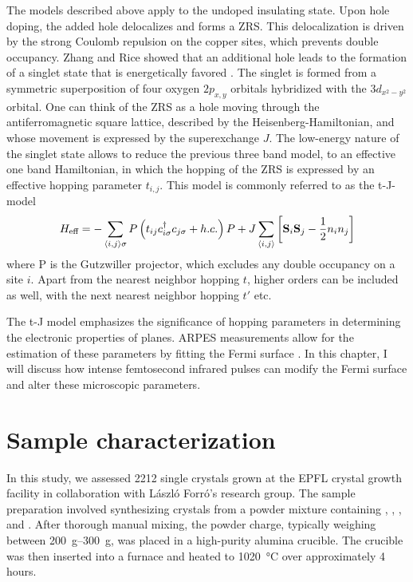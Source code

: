 The models described above apply to the undoped insulating state.
Upon hole doping, the added hole delocalizes and forms a ZRS.
This delocalization is driven by the strong Coulomb repulsion on the copper sites, which prevents double occupancy.
Zhang and Rice showed that an additional hole leads to the formation of a singlet state that is energetically favored \cite{zhang_effective_1988}.
The singlet is formed from a symmetric superposition of four oxygen $2p_{x,y}$ orbitals hybridized with the  $3d_{x^2-y^2}$ orbital.
One can think of the ZRS as a hole moving through the antiferromagnetic square lattice, described by the Heisenberg-Hamiltonian, and whose movement is expressed by the superexchange $J$.
The low-energy nature of the singlet state allows to reduce the previous three band model, to an effective one band Hamiltonian, in which the hopping of the ZRS is expressed by an effective hopping parameter $t_{i,j}$.
This model is commonly referred to as the t-J-model
\begin{equation}
	H_\text{eff} = - \sum_{\braket{i,j}\sigma} P \left( t_{ij} c_{i\sigma}^\dagger c_{j\sigma} + h.c. \right) P + J \sum_{\braket{i,j}} \left[\mathbf{S}_i \mathbf{S}_j - \frac{1}{2} n_i n_j\right]
\end{equation}
where P is the Gutzwiller projector, which excludes any double occupancy on a site $i$.
Apart from the nearest neighbor hopping $t$, higher orders can be included as well, with the next nearest neighbor hopping $t'$ etc.

The t-J model emphasizes the significance of hopping parameters in determining the electronic properties of  planes.
ARPES measurements allow for the estimation of these parameters by fitting the Fermi surface \cite{norman_phenomenological_1995}.
In this chapter, I will discuss how intense femtosecond infrared pulses can modify the Fermi surface and alter these microscopic parameters.

\section{Sample characterization}

In this study, we assessed 2212 single crystals grown at the EPFL crystal growth facility in collaboration with László Forró's research group.
The sample preparation involved synthesizing crystals from a powder mixture containing , , , and .
After thorough manual mixing, the powder charge, typically weighing between \qtyrange{200}{300}{\gram}, was placed in a high-purity alumina crucible. The crucible was then inserted into a furnace and heated to \qty{1020}{\degreeCelsius} over approximately 4 hours.

